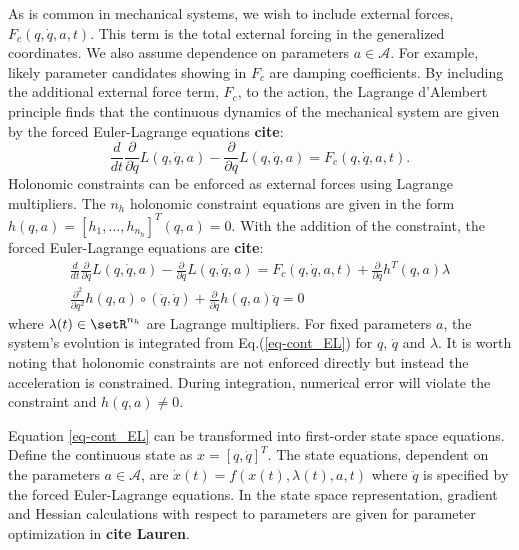 \documentclass[letterpaper, 10pt, conference]{ieeeconf}
\begin{document}
As is common in mechanical systems, we wish to include external forces, $F_c(q,\dot{q},a,t)$.  This term is the total external forcing in the generalized coordinates.  We also assume dependence on parameters $a\in\mathcal{A}$.  For example, likely parameter candidates showing in $F_c$ are damping coefficients.  By including the additional external force term, $F_c$, to the action, the Lagrange d'Alembert principle finds that the continuous dynamics of the mechanical system are given by the forced Euler-Lagrange equations \textbf{cite}:
\[
\frac{d}{d t}\frac{\partial}{\partial \dot{q}}L(q,\dot{q},a) - \frac{\partial}{\partial q}L(q,\dot{q},a) = F_c(q,\dot{q},a,t).
\]
Holonomic constraints can be enforced as external forces using Lagrange multipliers.  The $n_h$ holonomic constraint equations are given in the form $h(q,a)= [h_1,\ldots,h_{n_h}]^T(q,a) = 0$.  With the addition of the constraint, the forced Euler-Lagrange equations are \textbf{cite}:
\begin{equation}
\begin{array}{c}
\frac{d}{d t}\frac{\partial}{\partial \dot{q}}L(q,\dot{q},a) - \frac{\partial}{\partial q}L(q,\dot{q},a) = F_c(q,\dot{q},a,t) + \frac{\partial}{\partial q}h^T(q,a)\lambda\\
\frac{\partial^2}{\partial q^2}h(q,a)\circ(\dot{q},\dot{q}) + \frac{\partial}{\partial q}h(q,a)\ddot{q} = 0 
\end{array}
\label{eq-cont_EL}
\end{equation}
where $\lambda(t)\in\setR^{n_h}$ are Lagrange multipliers.  For fixed parameters $a$, the system's evolution is integrated from Eq.(\ref{eq-cont_EL}) for $q$, $\dot{q}$ and $\lambda$.  It is worth noting that holonomic constraints are not enforced directly but instead the acceleration is constrained.  During integration, numerical error will violate the constraint and $h(q,a)\neq 0$.

Equation \ref{eq-cont_EL} can be transformed into first-order state space equations.  Define the continuous state as $x = [q,\dot{q}]^T$.  The state equations, dependent on the parameters $a\in\mathcal{A}$, are $\dot{x}(t) = f(x(t),\lambda(t),a,t)$ where $\ddot{q}$ is specified by the forced Euler-Lagrange equations.  In the state space representation, gradient and Hessian calculations with respect to parameters are given for parameter optimization in \textbf{cite Lauren}.
\end{document}
